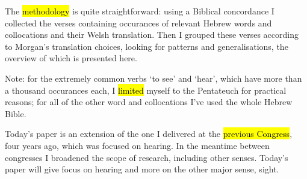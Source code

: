 \begin{paper}
	{\click} The \hl{methodology} is quite straightforward: using a Biblical concordance I collected the verses containing occurances of relevant Hebrew words and collocations and their Welsh translation. Then I grouped these verses according to Morgan’s translation choices, looking for patterns and generalisations, the overview of which is presented here.

	{\click} Note: for the extremely common verbs  ‘to see’ and  ‘hear’, which have more than a thousand occurances each, I \hl{limited} myself to the Pentateuch for practical reasons; for all of the other word and collocations I’ve used the whole Hebrew Bible.

	{\click} Today’s paper is an extension of the one I delivered at the \hl{previous Congress}, four years ago, which was focused on hearing. In the meantime between congresses I broadened the scope of research, including other senses. Today’s paper will give focus on hearing and more on the other major sense, sight.
\end{paper}
